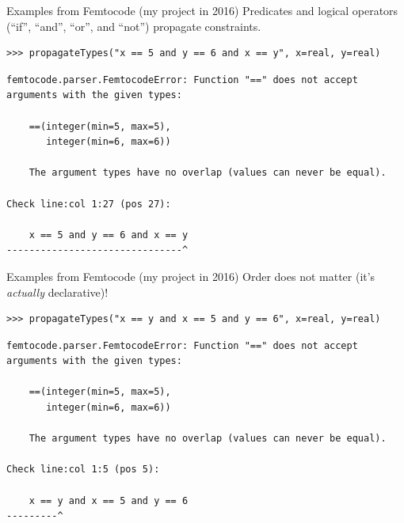 \documentclass[aspectratio=169]{beamer}
\begin{document}
\begin{frame}[fragile]{Examples from Femtocode (my project in 2016)}
\vspace{0.5 cm}
Predicates and logical operators (``if'', ``and'', ``or'', and ``not'') propagate constraints.

\small
\begin{verbatim}
>>> propagateTypes("x == 5 and y == 6 and x == y", x=real, y=real)
\end{verbatim}
{\color{red}
\begin{verbatim}
femtocode.parser.FemtocodeError: Function "==" does not accept
arguments with the given types:

    ==(integer(min=5, max=5),
       integer(min=6, max=6))

    The argument types have no overlap (values can never be equal).

Check line:col 1:27 (pos 27):

    x == 5 and y == 6 and x == y
-------------------------------^
\end{verbatim}}
\end{frame}

\begin{frame}[fragile]{Examples from Femtocode (my project in 2016)}
\vspace{0.5 cm}
Order does not matter (it's {\it actually} declarative)!

\small
\begin{verbatim}
>>> propagateTypes("x == y and x == 5 and y == 6", x=real, y=real)
\end{verbatim}
{\color{red}
\begin{verbatim}
femtocode.parser.FemtocodeError: Function "==" does not accept
arguments with the given types:

    ==(integer(min=5, max=5),
       integer(min=6, max=6))

    The argument types have no overlap (values can never be equal).

Check line:col 1:5 (pos 5):

    x == y and x == 5 and y == 6
---------^
\end{verbatim}}
\end{frame}
\end{document}
